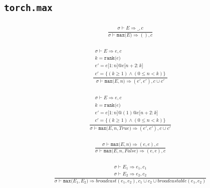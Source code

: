 \documentclass{article}
\makeatletter
\newcommand{\Rar}{\Rightarrow}
\newcommand{\mtt}[1]{\mathtt{#1}}
\newcommand{\op}[2]{\mtt{#1(}#2\mtt{)}}
\newcommand{\conc}{\mtt{@}}
\newcommand{\indr}[2]{\mtt{[}#1\mtt{:}#2\mtt{]}}
\makeatother
\begin{document}
\subsection*{\texttt{torch.max}}%
\begin{align*}
  \frac
  {
    \begin{array}{l}
      \sigma \vdash E \Rar \_, c
    \end{array}
  }
  {
    \sigma \vdash \op{max}{E} \Rar (), c
  }
\end{align*}

\begin{align*}
  \frac
  {
    \begin{array}{l}
      \sigma \vdash E \Rar e, c \\
      k = \op{rank}{e} \\
      e' = e \indr{1}{n} \conc e \indr{n+2}{k} \\
      c' = \{ (k \geq 1) \land (0 \leq n < k) \}
    \end{array}
  }
  {
    \sigma \vdash \op{max}{E, n} \Rar (e', e'), c \cup c'
  }
  \tag*{tuple 형태로 반환}
\end{align*}

\begin{align*}
  \frac
  {
    \begin{array}{l}
      \sigma \vdash E \Rar e, c \\
      k = \op{rank}{e} \\
      e' = e \indr{1}{n} \conc (1) \conc e \indr{n+2}{k} \\
      c' = \{ (k \geq 1) \land (0 \leq n < k) \}
    \end{array}
  }
  {
    \sigma \vdash \op{max}{E, n, True} \Rar (e', e'), c \cup c'
  }
  \tag*{tuple 형태로 반환}
\end{align*}

\begin{align*}
  \frac
  {
    \sigma \vdash \op{max}{E, n} \Rar (e, e), c
  }
  {
    \sigma \vdash \op{max}{E, n, False} \Rar (e, e), c
  }
  \tag*{tuple 형태로 반환}
\end{align*}

\begin{align*}
  \frac
  {
    \begin{array}{l}
      \sigma \vdash E_1 \Rar e_1, c_1 \\
      \sigma \vdash E_2 \Rar e_2, c_2
    \end{array}
  }
  {
    \sigma \vdash \op{max}{E_1, E_2} \Rar broadcast(e_1, e_2),
      c_1 \cup c_2 \cup broadcastable(e_1, e_2)
  }
\end{align*}%
\end{document}
